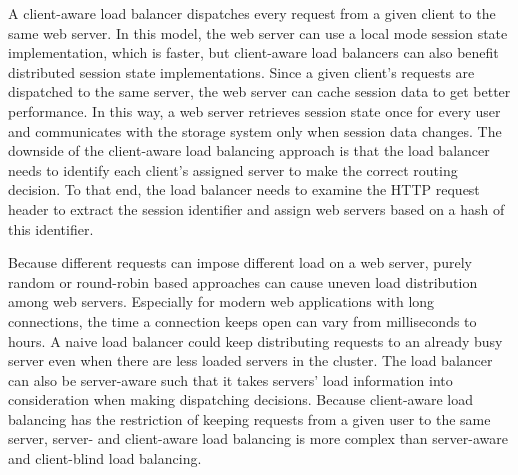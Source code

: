 A client-aware load balancer dispatches every request from a given client to
the same web server. In this model, the web server can use a local mode
session state implementation, which is faster, but client-aware load balancers
can also benefit distributed session state implementations.
Since a given client's requests are dispatched to the same
server, the web server can cache session data to get better performance.  
In this way, a web server retrieves session state once for every user and
communicates with the storage system only when session data changes. The
downside of the client-aware load balancing approach is that the load balancer needs
to identify each client's assigned server to make the correct routing
decision. To that end, the load balancer needs to examine the HTTP request
header to extract the session identifier and assign web servers based on a
hash of this identifier.

Because different requests can impose different load on a web server, purely random 
or round-robin based approaches can cause uneven load distribution
among web servers. Especially for modern web applications with long
connections, the time a connection keeps open can vary from milliseconds to
hours. A naive load balancer could keep distributing requests to an already busy
server even when there are less loaded servers in the cluster. The load balancer 
can also be server-aware such that  it  takes servers' load information into
consideration when making dispatching decisions. Because client-aware load
balancing has the restriction of keeping requests from a given user to the
same server, server- and client-aware load balancing is more complex than
server-aware and client-blind load balancing.
 



